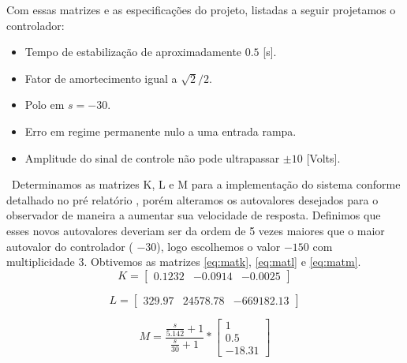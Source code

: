 \documentclass{article}
\begin{document}
Com essas matrizes e as especificações do projeto, listadas a seguir projetamos o controlador:
\begin{itemize}
	\item Tempo de estabilização de aproximadamente $0.5$ [s].
	\item Fator de amortecimento igual a $\sqrt{2}/2$.
	\item Polo em $s=-30$.
	\item Erro em regime permanente nulo a uma entrada rampa.
	\item Amplitude do sinal de controle não pode ultrapassar $\pm10$ [Volts].
\end{itemize}\
 Determinamos as matrizes K, L e M para a implementação do sistema conforme detalhado no pré relatório \cite{bb:prelab6}, porém alteramos os autovalores desejados para o observador de maneira a aumentar sua velocidade de resposta. Definimos que esses novos autovalores deveriam ser da ordem de 5 vezes maiores que o maior autovalor do controlador ( $-30$), logo escolhemos o valor $-150$ com multiplicidade 3. Obtivemos as matrizes \ref{eq:matk}, \ref{eq:matl} e \ref{eq:matm}.
\begin{equation}
\label{eq:matk}
K=
\begin{bmatrix}
0.1232 & -0.0914 & -0.0025
\end{bmatrix}
\end{equation}

\begin{equation}
\label{eq:matl}
L=
\begin{bmatrix}
329.97 & 24578.78 & -669182.13
\end{bmatrix}
\end{equation}

\begin{equation}
\label{eq:matm}
M = \frac{\frac{s}{5.142} + 1}{\frac{s}{30} + 1}*
\begin{bmatrix}
1\\
0.5\\
-18.31
\end{bmatrix}
\end{equation}
\end{document}
